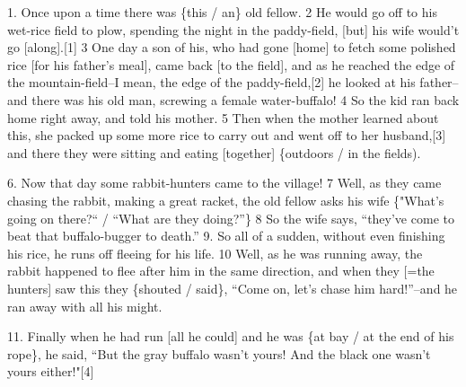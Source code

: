 \setcounter{footnote}{0}


1. Once upon a time there was \{this / an\} old fellow. 2 He would go off to his
wet-rice field to plow, spending the night in the paddy-field, [but] his wife would't
go [along].[1] 3 One day a son of his, who had gone [home] to fetch some polished
rice [for his father's meal], came back [to the field], and as he reached the edge
of the mountain-field--I mean, the edge of the paddy-field,[2] he looked at his
father--and there was his old man, screwing a female water-buffalo! 4 So the kid
ran back home right away, and told his mother. 5 Then when the mother learned about
this, she packed up some more rice to carry out and went off to her husband,[3]
and there they were sitting and eating [together] \{outdoors / in the fields).

6. Now that day some rabbit-hunters came to the village! 7 Well, as they came chasing
the rabbit, making a great racket, the old fellow asks his wife \{"What's
going on there?`` / ``What are they doing?''\} 8 So the
wife says, ``they've come to beat that buffalo-bugger to death.''
9. So all of a sudden, without even finishing his rice, he runs off fleeing for
his life. 10 Well, as he was running away, the rabbit happened to flee after him
in the same direction, and when they [=the hunters] saw this they \{shouted / said\},
``Come on, let's chase him hard!''--and he ran away with all his
might.

11. Finally when he had run [all he could] and he was \{at bay / at the end of his
rope\}, he said, ``But the gray buffalo wasn't yours! And the black one
wasn't yours either!"[4]

